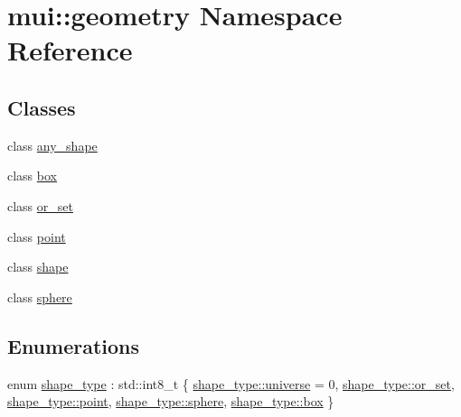 \hypertarget{namespacemui_1_1geometry}{}\section{mui\+:\+:geometry Namespace Reference}
\label{namespacemui_1_1geometry}
\subsection*{Classes}
\begin{DoxyCompactItemize}
\item 
class \hyperlink{classmui_1_1geometry_1_1any__shape}{any\+\_\+shape}
\item 
class \hyperlink{classmui_1_1geometry_1_1box}{box}
\item 
class \hyperlink{classmui_1_1geometry_1_1or__set}{or\+\_\+set}
\item 
class \hyperlink{classmui_1_1geometry_1_1point}{point}
\item 
class \hyperlink{classmui_1_1geometry_1_1shape}{shape}
\item 
class \hyperlink{classmui_1_1geometry_1_1sphere}{sphere}
\end{DoxyCompactItemize}
\subsection*{Enumerations}
\begin{DoxyCompactItemize}
\item 
enum \hyperlink{namespacemui_1_1geometry_a5f311a343181e2f20482e5c9afb0f136}{shape\+\_\+type} \+: std\+::int8\+\_\+t \{ \newline
\hyperlink{namespacemui_1_1geometry_a5f311a343181e2f20482e5c9afb0f136a7d9a0d11cb36e12a68817aff945390de}{shape\+\_\+type\+::universe} = 0, 
\hyperlink{namespacemui_1_1geometry_a5f311a343181e2f20482e5c9afb0f136a9874cd87b8cb5e46f16c7eec55e6bcbc}{shape\+\_\+type\+::or\+\_\+set}, 
\hyperlink{namespacemui_1_1geometry_a5f311a343181e2f20482e5c9afb0f136a78ee54aa8f813885fe2fe20d232518b9}{shape\+\_\+type\+::point}, 
\hyperlink{namespacemui_1_1geometry_a5f311a343181e2f20482e5c9afb0f136a34248a9bfcbd589d9b5fccb6a0ac6963}{shape\+\_\+type\+::sphere}, 
\newline
\hyperlink{namespacemui_1_1geometry_a5f311a343181e2f20482e5c9afb0f136a34be958a921e43d813a2075297d8e862}{shape\+\_\+type\+::box}
 \}
\end{DoxyCompactItemize}
